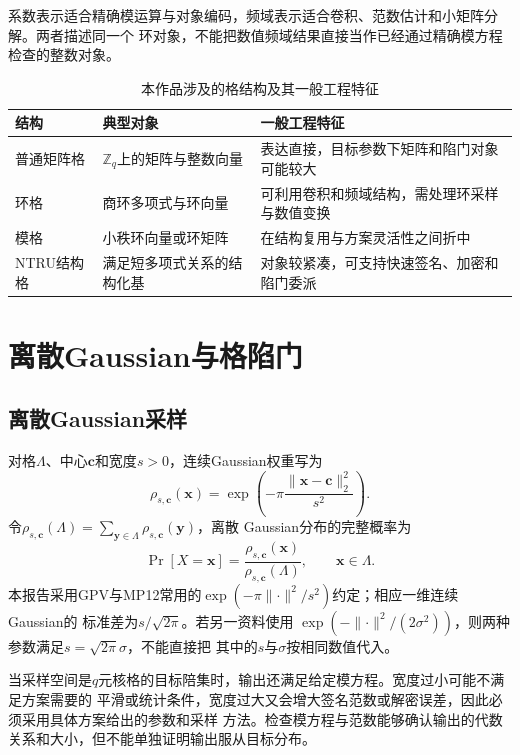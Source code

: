 系数表示适合精确模运算与对象编码，频域表示适合卷积、范数估计和小矩阵分解。两者描述同一个
环对象，不能把数值频域结果直接当作已经通过精确模方程检查的整数对象。

\begin{table}[H]
\centering\small
\caption{本作品涉及的格结构及其一般工程特征}
\label{tab:lattice-families}
\begin{tabularx}{\textwidth}{@{}p{}p{}X@{}}
\toprule
\rowcolor{black!8} 结构 & 典型对象 & 一般工程特征 \\
\midrule
普通矩阵格 & $\mathbb Z_q$上的矩阵与整数向量 & 表达直接，目标参数下矩阵和陷门对象可能较大 \\
环格 & 商环多项式与环向量 & 可利用卷积和频域结构，需处理环采样与数值变换 \\
模格 & 小秩环向量或环矩阵 & 在结构复用与方案灵活性之间折中 \\
NTRU结构格 & 满足短多项式关系的结构化基 & 对象较紧凑，可支持快速签名、加密和陷门委派 \\
\bottomrule
\end{tabularx}
\end{table}

\section{离散Gaussian与格陷门}

\subsection{离散Gaussian采样}

对格$\Lambda$、中心$\mathbf c$和宽度$s>0$，连续Gaussian权重写为
\[
 \rho_{s,\mathbf c}(\mathbf x)=
 \exp\!\left(-\pi\frac{\lVert\mathbf x-\mathbf c\rVert_2^2}{s^2}\right).
\]
令$\rho_{s,\mathbf c}(\Lambda)=\sum_{\mathbf y\in\Lambda}\rho_{s,\mathbf c}(\mathbf y)$，离散
Gaussian分布的完整概率为
\[
 \Pr[X=\mathbf x]
 =\frac{\rho_{s,\mathbf c}(\mathbf x)}{\rho_{s,\mathbf c}(\Lambda)},
 \qquad \mathbf x\in\Lambda.
\]
本报告采用GPV与MP12常用的$\exp(-\pi\lVert\cdot\rVert^2/s^2)$约定；相应一维连续Gaussian的
标准差为$s/\sqrt{2\pi}$。若另一资料使用
$\exp(-\lVert\cdot\rVert^2/(2\sigma^2))$，则两种参数满足$s=\sqrt{2\pi}\sigma$，不能直接把
其中的$s$与$\sigma$按相同数值代入\cite{gpv2008,micciancio2012trapdoors}。

当采样空间是$q$元核格的目标陪集时，输出还满足给定模方程。宽度过小可能不满足方案需要的
平滑或统计条件，宽度过大又会增大签名范数或解密误差，因此必须采用具体方案给出的参数和采样
方法。检查模方程与范数能够确认输出的代数关系和大小，但不能单独证明输出服从目标分布。

